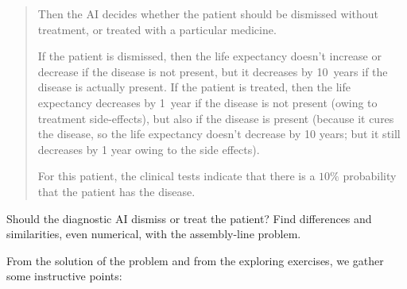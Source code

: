 \documentclass[
  a4paper,
  DIV=11,
  numbers=noendperiod,
  oneside]{scrreprt}
\begin{document}
\begin{tcolorbox}
\begin{enumerate}
\begin{quote}
  Then the AI decides whether the patient should be dismissed without
  treatment, or treated with a particular medicine.

  If the patient is dismissed, then the life expectancy doesn't increase
  or decrease if the disease is not present, but it decreases by
  10~years if the disease is actually present. If the patient is
  treated, then the life expectancy decreases by 1~year if the disease
  is not present (owing to treatment side-effects), but also if the
  disease is present (because it cures the disease, so the life
  expectancy doesn't decrease by 10 years; but it still decreases by 1
  year owing to the side effects).

  For this patient, the clinical tests indicate that there is a \(10\%\)
  probability that the patient has the disease.
  \end{quote}

  Should the diagnostic AI dismiss or treat the patient? Find
  differences and similarities, even numerical, with the assembly-line
  problem.
\end{enumerate}

\end{tcolorbox}

\hfill\break

From the solution of the problem and from the exploring exercises, we
gather some instructive points:
\end{document}
